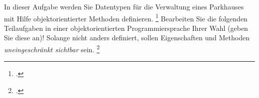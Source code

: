 \documentclass{lehramt-informatik-aufgabe}
\begin{document}

In dieser Aufgabe werden Sie Datentypen für die Verwaltung eines
Parkhauses mit Hilfe objektorientierter Methoden
definieren.
\footcite[Thema 2 Teilaufgabe 2 Aufgabe 1 Seite 11]{examen:66116:2014:03} Bearbeiten
Sie die folgenden Teilaufgaben in einer objektorientierten
Programmiersprache Ihrer Wahl (geben Sie diese an)! Solange nicht anders
definiert, sollen Eigenschaften und Methoden \emph{uneingeschränkt
sichtbar} sein.
\footcite[Aufgabenblatt 1: Abstrakte Klassen, Interface, Rekursion, Seite 2, Aufgabe 1]{aud:ab:1}
\end{document}
